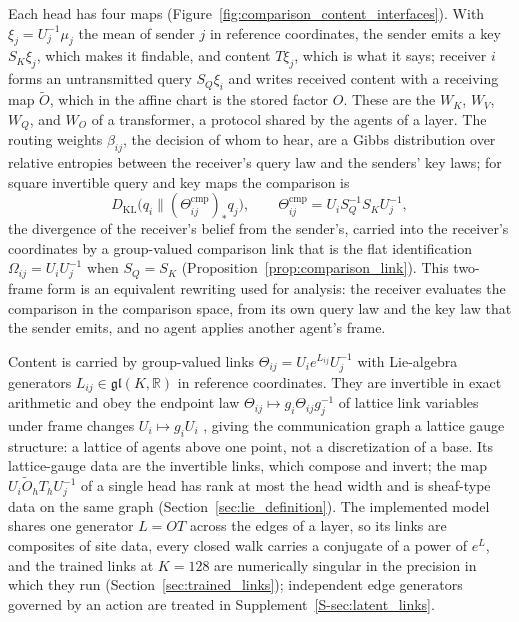 \documentclass[twoside,11pt]{article}
\begin{document}
Each head has four maps (Figure~\ref{fig:comparison_content_interfaces}). With $\xi_j=U_j^{-1}\mu_j$ the mean of sender $j$ in reference coordinates, the sender emits a key $S_K\xi_j$, which makes it findable, and content $T\xi_j$, which is what it says; receiver $i$ forms an untransmitted query $S_Q\xi_i$ and writes received content with a receiving map $\widetilde O$, which in the affine chart is the stored factor $O$. These are the $W_K$, $W_V$, $W_Q$, and $W_O$ of a transformer, a protocol shared by the agents of a layer. The routing weights $\beta_{ij}$, the decision of whom to hear, are a Gibbs distribution over relative entropies between the receiver's query law and the senders' key laws; for square invertible query and key maps the comparison is
\begin{equation}
D_{\mathrm{KL}}\bigl(q_i\|(\Theta^{\mathrm{cmp}}_{ij})_*q_j\bigr),\qquad
\Theta^{\mathrm{cmp}}_{ij}=U_iS_Q^{-1}S_KU_j^{-1},
\end{equation}
the divergence of the receiver's belief from the sender's, carried into the receiver's coordinates by a group-valued comparison link that is the flat identification $\Omega_{ij}=U_iU_j^{-1}$ when $S_Q=S_K$ (Proposition~\ref{prop:comparison_link}). This two-frame form is an equivalent rewriting used for analysis: the receiver evaluates the comparison in the comparison space, from its own query law and the key law that the sender emits, and no agent applies another agent's frame.

Content is carried by group-valued links $\Theta_{ij}=U_ie^{L_{ij}}U_j^{-1}$ with Lie-algebra generators $L_{ij}\in\mathfrak{gl}(K,\mathbb R)$ in reference coordinates. They are invertible in exact arithmetic and obey the endpoint law $\Theta_{ij}\mapsto g_i\Theta_{ij}g_j^{-1}$ of lattice link variables under frame changes $U_i\mapsto g_iU_i$ \citep{WilsonConfinement1974,Creutz1983}, giving the communication graph a lattice gauge structure: a lattice of agents above one point, not a discretization of a base. Its lattice-gauge data are the invertible links, which compose and invert; the map $U_i\widetilde O_hT_hU_j^{-1}$ of a single head has rank at most the head width and is sheaf-type data on the same graph (Section~\ref{sec:lie_definition}). The implemented model shares one generator $L=OT$ across the edges of a layer, so its links are composites of site data, every closed walk carries a conjugate of a power of $e^{L}$, and the trained links at $K=128$ are numerically singular in the precision in which they run (Section~\ref{sec:trained_links}); independent edge generators governed by an action are treated in Supplement~\ref{S-sec:latent_links}.
\end{document}
